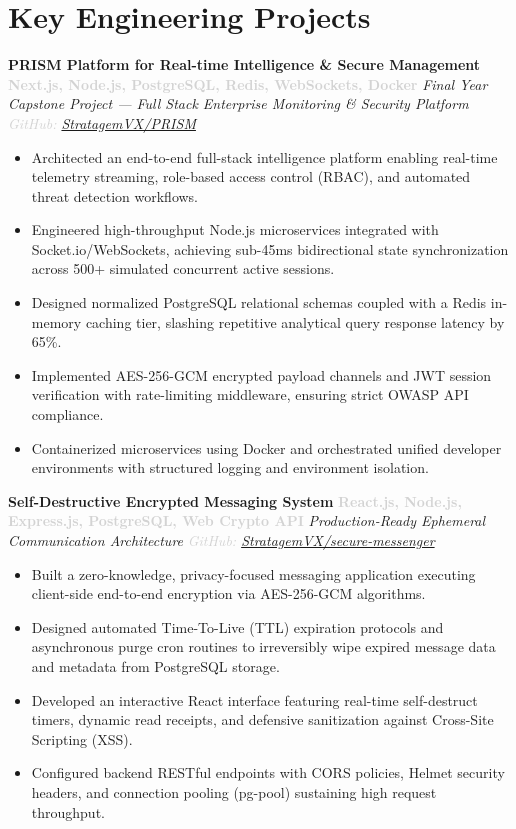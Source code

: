 \documentclass[a4paper,9pt]{article}
\newcommand{\projecttitle}[2]{\noindent\textbf{#1} \hfill \textcolor{lightgray}{\small\textbf{#2}}}
\newcommand{\projectsub}[2]{\noindent\textit{\small #1} \hfill \textcolor{lightgray}{\footnotesize\textit{#2}}}
\begin{document}
\section*{Key Engineering Projects}

\projecttitle{PRISM Platform for Real-time Intelligence \& Secure Management}{Next.js, Node.js, PostgreSQL, Redis, WebSockets, Docker}
\projectsub{Final Year Capstone Project --- Full Stack Enterprise Monitoring \& Security Platform}{GitHub: \href{https://github.com/StratagemVX/PRISM}{StratagemVX/PRISM}}
\begin{itemize}
\item Architected an end-to-end full-stack intelligence platform enabling real-time telemetry streaming, role-based access control (RBAC), and automated threat detection workflows.
\item Engineered high-throughput Node.js microservices integrated with Socket.io/WebSockets, achieving sub-45ms bidirectional state synchronization across 500+ simulated concurrent active sessions.
\item Designed normalized PostgreSQL relational schemas coupled with a Redis in-memory caching tier, slashing repetitive analytical query response latency by 65\%.
\item Implemented AES-256-GCM encrypted payload channels and JWT session verification with rate-limiting middleware, ensuring strict OWASP API compliance.
\item Containerized microservices using Docker and orchestrated unified developer environments with structured logging and environment isolation.
\end{itemize}

\vspace{0.3em}
\projecttitle{Self-Destructive Encrypted Messaging System}{React.js, Node.js, Express.js, PostgreSQL, Web Crypto API}
\projectsub{Production-Ready Ephemeral Communication Architecture}{GitHub: \href{https://github.com/StratagemVX/secure-messenger}{StratagemVX/secure-messenger}}
\begin{itemize}
\item Built a zero-knowledge, privacy-focused messaging application executing client-side end-to-end encryption via AES-256-GCM algorithms.
\item Designed automated Time-To-Live (TTL) expiration protocols and asynchronous purge cron routines to irreversibly wipe expired message data and metadata from PostgreSQL storage.
\item Developed an interactive React interface featuring real-time self-destruct timers, dynamic read receipts, and defensive sanitization against Cross-Site Scripting (XSS).
\item Configured backend RESTful endpoints with CORS policies, Helmet security headers, and connection pooling (pg-pool) sustaining high request throughput.
\end{itemize}
\end{document}
